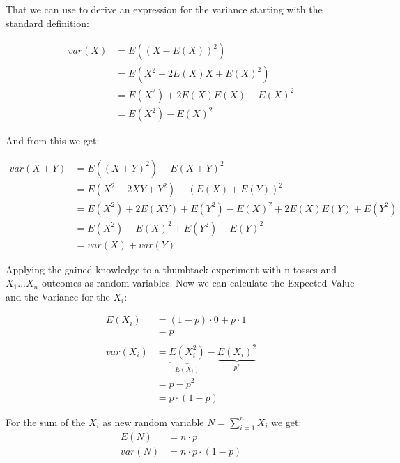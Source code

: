 \documentclass[../main/Notes.tex]{subfiles}
\begin{document}
That we can use to derive an expression for the variance starting with the standard definition:

\begin{align*}
  var\left(X\right) &= E\left(\left(X-E\left(X\right)\right)^2\right)\\
  &= E\left(X^2 - 2E\left(X\right)X + E\left(X\right)^2\right)\\
  &= E\left(X^2\right) + 2E\left(X\right)E\left(X\right) + E\left(X\right)^2\\
  &= E\left(X^2\right) - E\left(X\right)^2
\end{align*}

And from this we get:

\begin{align*}
  var\left(X+Y\right) &= E\left(\left(X+Y\right)^2\right)-E\left(X+Y\right)^2\\
  &= E\left(X^2 + 2XY + Y^2\right) - \left(E\left(X\right)+E\left(Y\right)\right)^2\\
  &= E\left(X^2\right) + 2E\left(XY\right)+E\left(Y^2\right)  - E\left(X\right)^2 + 2E\left(X\right)E\left(Y\right) + E\left(Y^2\right)\\
  &= E\left(X^2\right)- E\left(X\right)^2 + E\left(Y^2\right) - E\left(Y\right)^2\\
  &= var\left(X\right)+ var\left(Y\right)
\end{align*}

Applying the gained knowledge to a thumbtack experiment with n tosses and $X_1...X_n$ outcomes as random variables. 
Now we can calculate the Expected Value and the Variance for the $X_i$:

\begin{align*}
  E\left(X_i\right) & = \left(1-p\right) \cdot 0 + p \cdot 1\\
  &= p\\
  \\
  var\left(X_i\right) & = \underbrace{E\left(X_i^2\right)}_{E\left(X_i\right)} - \underbrace{E\left(X_i\right)^2}_{p^2}\\
  &= p-p^2\\
  &= p\cdot\left(1-p\right)
\end{align*}


For the sum of the $X_i$ as new random variable $N=\sum_{i=1}^n X_i$ we get:
\begin{align*}
  E\left(N\right) &= n\cdot p\\
  var\left(N\right) &= n\cdot p \cdot \left(1-p\right)
\end{align*}
\end{document}
